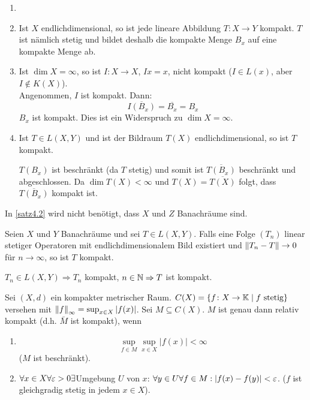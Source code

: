 \begin{beispiel*}
	\begin{enumerate}
		\item[]
		\item Ist $ X $ endlichdimensional, so ist jede lineare Abbildung $ T\colon X\rightarrow Y $ kompakt. $ T $ ist n\"amlich stetig und bildet deshalb die kompakte Menge $ B_x $ auf eine kompakte Menge ab.
		\item Ist $ \dim X=\infty $, so ist $ I\colon X\rightarrow X $, $ Ix=x $, nicht kompakt ($ I\in L(x) $, aber $ I\notin K(X) $).\\
		Angenommen, $ I $ ist kompakt. Dann:
		\[ \overline{I(B_x)}=\overline{B_x}=B_x \]
		$ B_x $ ist kompakt. Dies ist ein Widerspruch zu $ \dim X=\infty $.
		\item Ist $ T\in L(X,Y) $ und ist der Bildraum $ T(X) $ endlichdimensional, so ist $ T $ kompakt.
		\begin{beweis}
			$ T(B_x) $ ist beschr\"ankt (da $ T $ stetig) und somit ist $ \overline{T(B_x)} $ beschr\"ankt und abgeschlossen. Da $ \dim T(X)<\infty $ und $ T(X)=\overline{T(X)} $ folgt, dass $ \overline{T(B_x)} $ kompakt ist.
		\end{beweis}
	\end{enumerate}
\end{beispiel*}
\begin{bemerkung*}
	In \ref{satz4.2} wird nicht ben\"otigt, dass $ X $ und $ Z $ Banachr\"aume sind.
\end{bemerkung*}
\begin{korollar}
	Seien $ X $ und $ Y $ Banachr\"aume und sei $ T\in L(X,Y) $. Falls eine Folge $ (T_n) $ linear stetiger Operatoren mit endlichdimensionalem Bild existiert und $ \left\|T_n-T\right\|\rightarrow 0 $ f\"ur $ n\rightarrow\infty $, so ist $ T $ kompakt.
\end{korollar}
\begin{beweis}
	$ T_n\in L(X,Y)\Rightarrow T_n$ kompakt, $ n\in\mathbb{N}\Rightarrow T$ ist kompakt.
\end{beweis}
\newpage
\begin{satz}
	Sei $ (X,d) $ ein kompakter metrischer Raum. $ C(X)=\lbrace f\colon X\rightarrow\mathbb{K}\mid f\text{ stetig}\rbrace $ versehen mit $ \left\|f\right\|_\infty=\sup_{x\in X}|f(x)| $. Sei $ M\subseteq C(X) $. $ M $ ist genau dann relativ kompakt (d.h. $ \bar M $ ist kompakt), wenn
	\begin{enumerate}
		\item \[ \sup_{f\in M}\sup_{x\in X}|f(x)|<\infty \]
		($ M $ ist beschr\"ankt).
		\item $ \forall x\in X\forall\varepsilon>0\exists $Umgebung $ U $ von $ x $: $ \forall y\in U\forall f\in M: |f(x)-f(y)|<\varepsilon $. ($ f $ ist gleichgradig stetig in jedem $ x\in X $).
	\end{enumerate} 
\end{satz}
